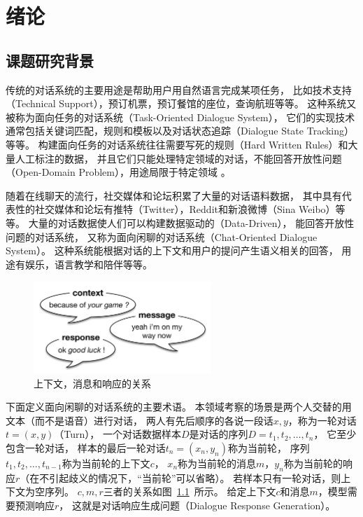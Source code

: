 \chapter{绪论}\label{ch:introduction}

\section{课题研究背景}\label{sec:research_background}
传统的对话系统的主要用途是帮助用户用自然语言完成某项任务，
比如技术支持（Technical Support），预订机票，预订餐馆的座位，查询航班等等。
这种系统又被称为面向任务的对话系统（Task-Oriented Dialogue System），
它们的实现技术通常包括关键词匹配，规则和模板以及对话状态追踪（Dialogue State Tracking）等等。
构建面向任务的对话系统往往需要写死的规则（Hard Written Rules）和大量人工标注的数据，
并且它们只能处理特定领域的对话，不能回答开放性问题（Open-Domain Problem），用途局限于特定领域
。

随着在线聊天的流行，社交媒体和论坛积累了大量的对话语料数据，
其中具有代表性的社交媒体和论坛有推特（Twitter），Reddit和新浪微博（Sina Weibo）等等。
大量的对话数据使人们可以构建数据驱动的（Data-Driven），
能回答开放性问题的对话系统，
又称为面向闲聊的对话系统（Chat-Oriented Dialogue System）。
这种系统能根据对话的上下文和用户的提问产生语义相关的回答，
用途有娱乐，语言教学和陪伴等等。
\begin{figure}[H]
    \includegraphics[width=0.6\textwidth]{figure/context_message_response.png}
    \centering
    \caption{上下文，消息和响应的关系}
    \label{fig:context_message_response}
\end{figure}

下面定义面向闲聊的对话系统的主要术语。
本领域考察的场景是两个人交替的用文本（而不是语音）进行对话，
两人有先后顺序的各说一段话$x, y$，称为一轮对话$t = (x, y)$（Turn），
一个对话数据样本$D$是对话的序列$D = t_1, t_2, \dots, t_n$，
它至少包含一轮对话，
样本的最后一轮对话$t_n = (x_n, y_n)$称为当前轮，
序列$t_1, t_2, \dots, t_{n-1}$称为当前轮的上下文$c$，
$x_n$称为当前轮的消息$m$，$y_n$称为当前轮的响应$r$（在不引起歧义的情况下，“当前轮”可以省略）。
若样本只有一轮对话，则上下文为空序列。
$c,m,r$三者的关系如图~\ref{fig:context_message_response}~所示。
给定上下文$c$和消息$m$，模型需要预测响应$r$，
这就是对话响应生成问题（Dialogue Response Generation）。


